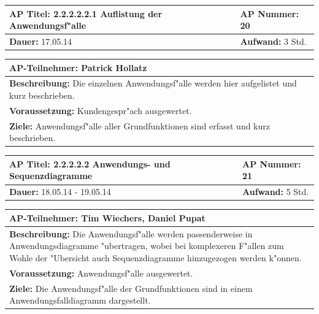 \documentclass[fontsize=12pt,paper=a4,twoside]{scrartcl}
\begin{document}
\begin{tabular}{|p{7.43cm}|p{7.43cm}|}
\hline
\textbf{AP Titel: }2.2.2.2.2.1 Auflistung der Anwendungsf"alle & \textbf{AP Nummer: }20\\ 
\hline
\textbf{Dauer: }17.05.14 & \textbf{Aufwand: } 3 Std.\\
\hline
\end{tabular}
\begin{tabular}{|p{15.3cm}|}
\hline
\textbf{AP-Teilnehmer: }Patrick Hollatz\\
\hline
\textbf{Beschreibung: }Die einzelnen Anwendungsf"alle werden hier aufgelistet und kurz beschrieben.\\
\hline
\textbf{Voraussetzung: }Kundengespr"ach ausgewertet.\\
\hline 
\textbf{Ziele: }Anwendungsf"alle aller Grundfunktionen sind erfasst und kurz beschrieben.\\
\hline 
\end{tabular}

\begin{tabular}{|p{7.43cm}|p{7.43cm}|}
\hline
\textbf{AP Titel: }2.2.2.2.2 Anwendungs- und Sequenzdiagramme & \textbf{AP Nummer: }21\\ 
\hline
\textbf{Dauer: }18.05.14 - 19.05.14 & \textbf{Aufwand: } 5 Std.\\
\hline
\end{tabular}
\begin{tabular}{|p{15.3cm}|}
\hline
\textbf{AP-Teilnehmer: }Tim Wiechers, Daniel Pupat\\
\hline
\textbf{Beschreibung: }Die Anwendungsf"alle werden passenderweise in Anwendungsdiagramme "ubertragen, wobei bei komplexeren F"allen zum Wohle der "Ubersicht auch Sequenzdiagramme hinzugezogen werden k"onnen.\\
\hline
\textbf{Voraussetzung: }Anwendungsf"alle ausgewertet.\\
\hline 
\textbf{Ziele: }Die Anwendungsf"alle der Grundfunktionen sind in einem Anwendungsfalldiagramm dargestellt.\\
\hline 
\end{tabular}
\end{document}
